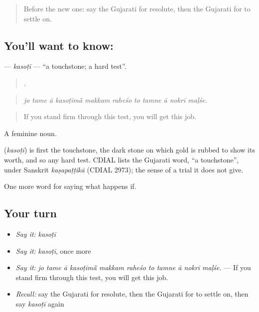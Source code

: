 \label{lesson:GU-C539-kasoti}



\begin{quote}
Before the new one: say the Gujarati for resolute, then the Gujarati for to settle on.
\end{quote}

\subsection*{You'll want to know: }
\textbf{} — \emph{kasoṭī} — \textquotedblleft{}a touchstone; a hard test\textquotedblright{}.

\begin{quote}
          .
\end{quote}

\begin{quote}
\emph{jo tame ā kasoṭīmā̃ makkam raheśo to tamne ā nokrī maḷśe.}
\end{quote}

\begin{quote}
If you stand firm through this test, you will get this job.
\end{quote}

A feminine noun.

\begin{cousinweb}
\textbf{} (\emph{kasoṭī}) is first the touchstone, the dark stone on which gold is rubbed to show its worth, and so any hard test. CDIAL lists the Gujarati word, \textquotedblleft{}a touchstone\textquotedblright{}, under Sanskrit \emph{kaṣapaṭṭikā} (CDIAL 2973); the sense of a trial it does not give.
\end{cousinweb}

\begin{grammarlens}[title={What you've built}]
One more word for saying what happens if.
\end{grammarlens}

\subsection*{Your turn}
\begin{itemize}
\raggedright
  \item \emph{Say it:} \emph{kasoṭī}
  \item \emph{Say it:} \emph{kasoṭī}, once more
  \item \emph{Say it:} \emph{jo tame ā kasoṭīmā̃ makkam raheśo to tamne ā nokrī maḷśe.} — If you stand firm through this test, you will get this job.
  \item \emph{Recall:} say the Gujarati for resolute, then the Gujarati for to settle on, then say \emph{kasoṭī} again
\end{itemize}

